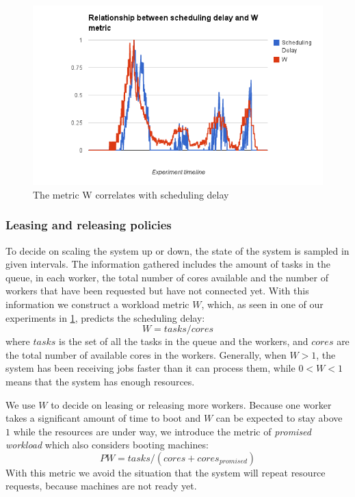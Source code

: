 \documentclass{stylesheet}
\begin{document}
\begin{figure}[b!]
	\centering
	\includegraphics[width=\linewidth]{SchedulingDelay-W.png}
	\caption{The metric W correlates with scheduling delay}
	\label{fig:scheduling-W}
\end{figure}

\subsubsection*{Leasing and releasing policies}
To decide on scaling the system up or down, the state of the system is sampled in given intervals. The information gathered includes the amount of tasks in the queue, in each worker, the total number of cores available and the number of workers that have been requested but have not connected yet. With this information we construct a workload metric $W$, which, as seen in one of our experiments in \cref{fig:scheduling-W}, predicts the scheduling delay: $$W = tasks/cores$$ where $tasks$ is the set of all the tasks in the queue and the workers, and $cores$ are the total number of available cores in the workers. Generally, when $W > 1$, the system has been receiving jobs faster than it can process them, while $0 < W < 1$ means that the system has enough resources.

We use $W$ to decide on leasing or releasing more workers. Because one worker takes a significant amount of time to boot and $W$ can be expected to stay above $1$ while the resources are under way, we introduce the metric of \textit{promised workload} which also considers booting machines: 
$$PW = tasks/(cores + cores_{promised})$$
With this metric we avoid the situation that the system will repeat resource requests, because machines are not ready yet.
\end{document}
